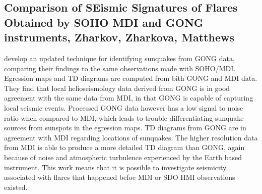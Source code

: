 \subsection{Comparison of SEismic Signatures of Flares Obtained by SOHO MDI and GONG instruments, Zharkov, Zharkova, Matthews}
\cite{2011ApJ...739...70Z} develop an updated technique for identifying sunquakes from GONG data, comparing their findings to the same observations made with SOHO/MDI. Egression maps and TD diagrams are computed from bith GONG and MDI data. They find that local helioseismology data derived from GONG is in good agreement with the same data from MDI, in that GONG is capable of capturing local seismic events. Processed GONG data however has a low signal to noise ratio when compared to MDI, which leads to trouble differentiating sunquake sources from sunspots in the egression maps. TD diagrams from GONG are in agreement with MDI regarding locations of sunquakes. The higher resolution data from MDI is able to produce a more detailed TD diagram than GONG, again because of noise and atmospheric turbulence experienced by the Earth based instrument. This work means that it is possible to investigate seismicity associated with flares that happened befoe MDI or SDO HMI observations existed.    


